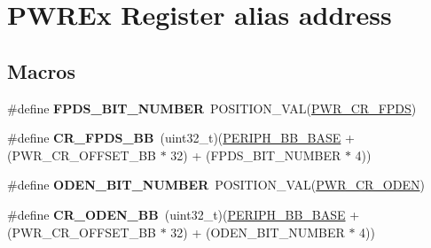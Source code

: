 \hypertarget{group___p_w_r_ex__register__alias__address}{}\section{P\+W\+R\+Ex Register alias address}
\label{group___p_w_r_ex__register__alias__address}
\subsection*{Macros}
\begin{DoxyCompactItemize}
\item 
\#define {\bfseries F\+P\+D\+S\+\_\+\+B\+I\+T\+\_\+\+N\+U\+M\+B\+ER}~P\+O\+S\+I\+T\+I\+O\+N\+\_\+\+V\+AL(\hyperlink{group___peripheral___registers___bits___definition_gafc01f8b6d4bd0294f745fde6d8e57002}{P\+W\+R\+\_\+\+C\+R\+\_\+\+F\+P\+DS})\hypertarget{group___p_w_r_ex__register__alias__address_gab04d9f278c4124285a9591c4f7098019}{}\label{group___p_w_r_ex__register__alias__address_gab04d9f278c4124285a9591c4f7098019}

\item 
\#define {\bfseries C\+R\+\_\+\+F\+P\+D\+S\+\_\+\+BB}~(uint32\+\_\+t)(\hyperlink{group___peripheral__memory__map_gaed7efc100877000845c236ccdc9e144a}{P\+E\+R\+I\+P\+H\+\_\+\+B\+B\+\_\+\+B\+A\+SE} + (P\+W\+R\+\_\+\+C\+R\+\_\+\+O\+F\+F\+S\+E\+T\+\_\+\+BB $\ast$ 32) + (F\+P\+D\+S\+\_\+\+B\+I\+T\+\_\+\+N\+U\+M\+B\+ER $\ast$ 4))\hypertarget{group___p_w_r_ex__register__alias__address_ga57d7041b5d1bf0ec94fa18152a7fa208}{}\label{group___p_w_r_ex__register__alias__address_ga57d7041b5d1bf0ec94fa18152a7fa208}

\item 
\#define {\bfseries O\+D\+E\+N\+\_\+\+B\+I\+T\+\_\+\+N\+U\+M\+B\+ER}~P\+O\+S\+I\+T\+I\+O\+N\+\_\+\+V\+AL(\hyperlink{group___peripheral___registers___bits___definition_gadbb849c6c4908d6f08f4fdc28d702522}{P\+W\+R\+\_\+\+C\+R\+\_\+\+O\+D\+EN})\hypertarget{group___p_w_r_ex__register__alias__address_gace51402e8067c2b478e3bcbc6efe0b70}{}\label{group___p_w_r_ex__register__alias__address_gace51402e8067c2b478e3bcbc6efe0b70}

\item 
\#define {\bfseries C\+R\+\_\+\+O\+D\+E\+N\+\_\+\+BB}~(uint32\+\_\+t)(\hyperlink{group___peripheral__memory__map_gaed7efc100877000845c236ccdc9e144a}{P\+E\+R\+I\+P\+H\+\_\+\+B\+B\+\_\+\+B\+A\+SE} + (P\+W\+R\+\_\+\+C\+R\+\_\+\+O\+F\+F\+S\+E\+T\+\_\+\+BB $\ast$ 32) + (O\+D\+E\+N\+\_\+\+B\+I\+T\+\_\+\+N\+U\+M\+B\+ER $\ast$ 4))\hypertarget{group___p_w_r_ex__register__alias__address_ga1ce2817ed3cc064b3577f90cbb23be35}{}\label{group___p_w_r_ex__register__alias__address_ga1ce2817ed3cc064b3577f90cbb23be35}


\end{DoxyCompactItemize}
